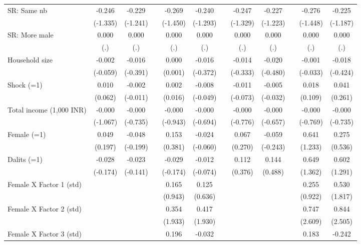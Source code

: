 {\begin{longtable}{@{\extracolsep{\fill}}lccccccccccc}
    SR: Same nb & -0.246 & -0.229 &   & -0.269 & -0.240 &   & -0.247 & -0.227 &   & -0.276 & -0.225 \\
      & (-1.335) & (-1.241) &   & (-1.450) & (-1.293) &   & (-1.329) & (-1.223) &   & (-1.448) & (-1.187) \\
    SR: More male & 0.000 & 0.000 &   & 0.000 & 0.000 &   & 0.000 & 0.000 &   & 0.000 & 0.000 \\
      & (.) & (.) &   & (.) & (.) &   & (.) & (.) &   & (.) & (.) \\
    Household size & -0.002 & -0.016 &   & 0.000 & -0.016 &   & -0.014 & -0.020 &   & -0.001 & -0.018 \\
      & (-0.059) & (-0.391) &   & (0.001) & (-0.372) &   & (-0.333) & (-0.480) &   & (-0.033) & (-0.424) \\
    Shock (=1) & 0.010 & -0.002 &   & 0.002 & -0.008 &   & -0.011 & -0.005 &   & 0.018 & 0.041 \\
      & (0.062) & (-0.011) &   & (0.016) & (-0.049) &   & (-0.073) & (-0.032) &   & (0.109) & (0.261) \\
    Total income (1,000 INR) & -0.000 & -0.000 &   & -0.000 & -0.000 &   & -0.000 & -0.000 &   & -0.000 & -0.000 \\
      & (-1.067) & (-0.735) &   & (-0.943) & (-0.694) &   & (-0.776) & (-0.657) &   & (-0.769) & (-0.735) \\
    Female (=1) & 0.049 & -0.048 &   & 0.153 & -0.024 &   & 0.067 & -0.059 &   & 0.641 & 0.275 \\
      & (0.197) & (-0.199) &   & (0.381) & (-0.060) &   & (0.270) & (-0.243) &   & (1.233) & (0.536) \\
    Dalits (=1) & -0.028 & -0.023 &   & -0.029 & -0.012 &   & 0.112 & 0.144 &   & 0.649 & 0.602 \\
      & (-0.174) & (-0.141) &   & (-0.174) & (-0.074) &   & (0.376) & (0.488) &   & (1.362) & (1.291) \\
    Female X Factor 1 (std) &   &   &   & 0.165 & 0.125 &   &   &   &   & 0.255 & 0.530 \\
      &   &   &   & (0.943) & (0.636) &   &   &   &   & (0.922) & (1.817) \\
    Female X Factor 2 (std) &   &   &   & 0.354 & 0.417 &   &   &   &   & 0.747 & 0.844 \\
      &   &   &   & (1.933) & (1.930) &   &   &   &   & (2.609) & (2.505) \\
    Female X Factor 3 (std) &   &   &   & 0.196 & -0.032 &   &   &   &   & 0.183 & -0.242 \\

\end{longtable}}
